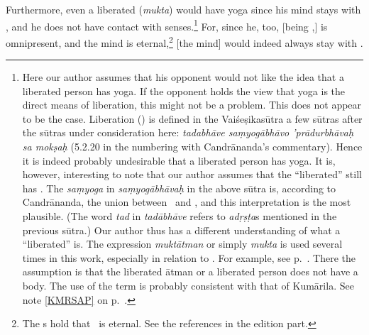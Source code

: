 Furthermore,%
 even a liberated (\emph{mukta}) would have yoga since his mind stays with \atman, and he does not have contact with senses.\footnote{Here our author assumes that his opponent would not like the idea that a liberated person has yoga.  If the opponent holds the view that yoga is the direct means of liberation, this might not be a problem. This does not appear to be the case.  Liberation (\moksa) is defined in the Vaiśeṣikasūtra a few sūtras after the sūtras under consideration here: \emph{ta\-da\-bhā\-ve saṃyogābhāvo ’prādurbhāvaḥ sa mokṣaḥ} (5.2.20 in the numbering with Candrānanda's commentary).  Hence it is indeed probably undesirable that a liberated person has yoga.  It is, however, interesting to note that our author assumes that the ``liberated'' still has \manas.  The \emph{saṃyoga} in \emph{saṃyogābhāvaḥ} in the above sūtra is, according to Candrānanda, the union between \atman\ and \manas, and this interpretation is the most plausible.  (The word \emph{tad} in \emph{tadābhāve} refers to \emph{adṛṣṭa}s mentioned in the previous sūtra.)  Our author thus has a different understanding of what a ``liberated'' is.  The expression \emph{muktātman} or simply \emph{mukta} is used several times in this work, especially in relation to \Isvara.  For example, see p.~\pageref{LBRTDATM}.  There the assumption is that the liberated ātman or a liberated person does not have a body.  The use of the term is probably consistent with that of Kumārila.  See note \ref{KMRSAP} on p.~\pageref{KMRSAP}.}  For, since he, too, [being \atman,] is omnipresent, and the mind is eternal,\footnote{The \Vaisesika s hold that \manas\ is eternal.  See the references in the edition part.} [the mind] would indeed always stay with \atman.
% 
% 

